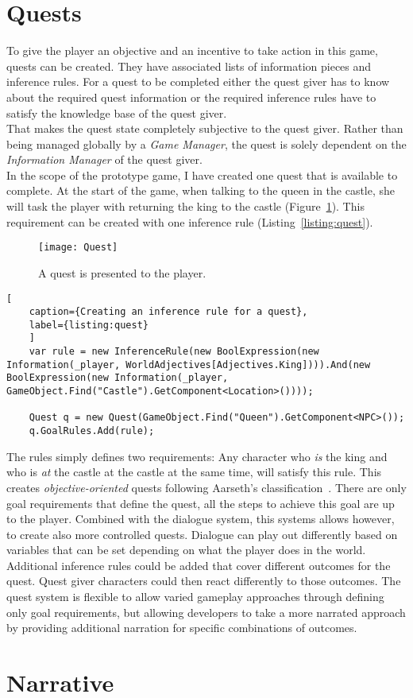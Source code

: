 \section{Quests}
To give the player an objective and an incentive to take action in this game, quests can be created. They have associated lists of information pieces and inference rules. For a quest to be completed either the quest giver has to know about the required quest information or the required inference rules have to satisfy the knowledge base of the quest giver.\\
That makes the quest state completely subjective to the quest giver. Rather than being managed globally by a \textit{Game Manager}, the quest is solely dependent on the \textit{Information Manager} of the quest giver.\\
In the scope of the prototype game, I have created one quest that is available to complete. At the start of the game, when talking to the queen in the castle, she will task the player with returning the king to the castle (Figure~\ref{fig:quest}). This requirement can be created with one inference rule (Listing~\ref{listing:quest}).
\begin{figure}
	\centering
	\texttt{[image: Quest]}
	\caption{A quest is presented to the player.}
	\label{fig:quest}
\end{figure}
\begin{lstlisting}[
	caption={Creating an inference rule for a quest},
	label={listing:quest}
	]
	var rule = new InferenceRule(new BoolExpression(new Information(_player, WorldAdjectives[Adjectives.King]))).And(new BoolExpression(new Information(_player, GameObject.Find("Castle").GetComponent<Location>())));
	
	Quest q = new Quest(GameObject.Find("Queen").GetComponent<NPC>());
	q.GoalRules.Add(rule);
\end{lstlisting}
The rules simply defines two requirements: Any character who \textit{is} the king and who is \textit{at} the castle at the castle at the same time, will satisfy this rule. This creates \textit{objective-oriented} quests following Aarseth's classification~\cite{Aarseth2005}. There are only goal requirements that define the quest, all the steps to achieve this goal are up to the player. Combined with the dialogue system, this systems allows however, to create also more controlled quests. Dialogue can play out differently based on variables that can be set depending on what the player does in the world. Additional inference rules could be added that cover different outcomes for the quest. Quest giver characters could then react differently to those outcomes. The quest system is flexible to allow varied gameplay approaches through defining only goal requirements, but allowing developers to take a more narrated approach by providing additional narration for specific combinations of outcomes.
\section{Narrative}

